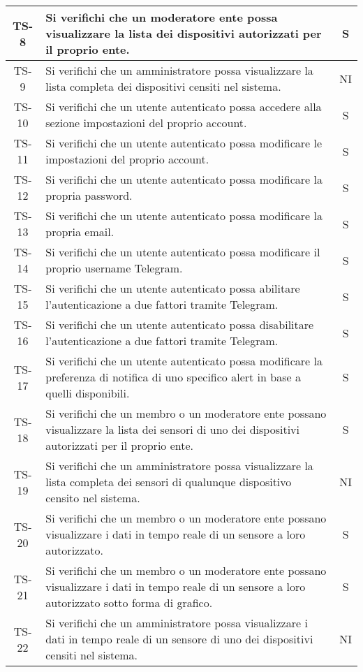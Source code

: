 \begin{center}
\begin{longtable}{|c|p{10cm}|c|}
			 TS-8 & Si verifichi che un moderatore ente possa visualizzare la lista dei dispositivi autorizzati per il proprio ente. & S \\
			 \hline
			 TS-9 & Si verifichi che un amministratore possa visualizzare la lista completa dei dispositivi censiti nel sistema. & NI \\
			 \hline
			 TS-10 & Si verifichi che un utente autenticato possa accedere alla sezione impostazioni del proprio account. & S \\
			 \hline
			 TS-11 & Si verifichi che un utente autenticato possa modificare le impostazioni del proprio account. & S \\
			 \hline
			 TS-12 & Si verifichi che un utente autenticato possa modificare la propria password. & S \\
			 \hline
			 TS-13 & Si verifichi che un utente autenticato possa modificare la propria email. & S \\
			 \hline
			 TS-14 & Si verifichi che un utente autenticato possa modificare il proprio username Telegram. & S \\
			 \hline
			 TS-15 & Si verifichi che un utente autenticato possa abilitare l'autenticazione a due fattori tramite Telegram. & S \\
			 \hline
			 TS-16 & Si verifichi che un utente autenticato possa disabilitare l'autenticazione a due fattori tramite Telegram. & S \\
			 \hline
			 TS-17 & Si verifichi che un utente autenticato possa modificare la preferenza di notifica di uno specifico alert in base a quelli disponibili. & S \\
			 \hline
			 TS-18 & Si verifichi che un membro o un moderatore ente possano visualizzare la lista dei sensori di uno dei dispositivi autorizzati per il proprio ente. & S \\
			 \hline
			 TS-19 & Si verifichi che un amministratore possa visualizzare la lista completa dei sensori di qualunque dispositivo censito nel sistema. & NI \\
			 \hline
			 TS-20 & Si verifichi che un membro o un moderatore ente possano visualizzare i dati in tempo reale di un sensore a loro autorizzato. & S \\
			 \hline
			 TS-21 & Si verifichi che un membro o un moderatore ente possano visualizzare i dati in tempo reale di un sensore a loro autorizzato sotto forma di grafico. & S \\
			 \hline
			 TS-22 & Si verifichi che un amministratore possa visualizzare i dati in tempo reale di un sensore di uno dei dispositivi censiti nel sistema. & NI \\

\end{longtable}
\end{center}
